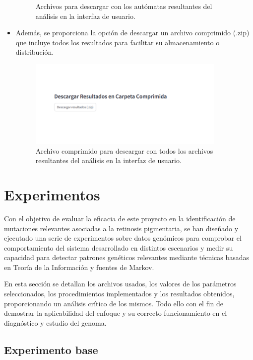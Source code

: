 \documentclass[11pt,spanish,listoffigures,listoftables]{tfgetsinf}
\begin{document}
\begin{itemize}
\begin{figure}[H]
      \caption{Archivos para descargar con los autómatas resultantes del análisis en la interfaz de usuario.}
      \label{fig:etiqueta_opcional10}
   \end{figure}
   \item Además, se proporciona la opción de descargar un archivo comprimido (.zip) que incluye todos los resultados para facilitar su almacenamiento o distribución. 
   \begin{figure}[H]
      \centering
      \includegraphics[width=0.9\textwidth]{Zip_RP.png}
      \caption{Archivo comprimido para descargar con todos los archivos resultantes del análisis en la interfaz de usuario.}
      \label{fig:etiqueta_opcional11}
   \end{figure}
\end{itemize}
 



\chapter{Experimentos}

Con el objetivo de evaluar la eficacia de este proyecto en la identificación de mutaciones relevantes asociadas a la retinosis pigmentaria, se han diseñado y ejecutado una serie de experimentos sobre datos genómicos para comprobar el comportamiento del sistema desarrollado en distintos escenarios y medir su capacidad para detectar patrones genéticos relevantes mediante técnicas basadas en Teoría de la Información y fuentes de Markov.  

En esta sección se detallan los archivos usados, los valores de los parámetros seleccionados, los procedimientos implementados y los resultados obtenidos, proporcionando un análisis crítico de los mismos. Todo ello con el fin de demostrar la aplicabilidad del enfoque y su correcto funcionamiento en el diagnóstico y estudio del genoma.  

\section{Experimento base}
\end{document}
